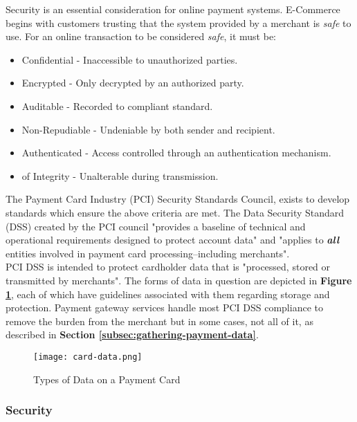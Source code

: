 Security is an essential consideration for online payment systems. E-Commerce begins with customers trusting that the system provided by a merchant is \textit{safe} to use. For an online transaction to be considered \textit{safe}, it must be:

\begin{itemize}
	\item Confidential - Inaccessible to unauthorized parties.
    \item Encrypted - Only decrypted by an authorized party.
    \item Auditable - Recorded to compliant standard.
    \item Non-Repudiable - Undeniable by both sender and recipient.
    \item Authenticated - Access controlled through an authentication mechanism.
    \item of Integrity - Unalterable during transmission.
\end{itemize}

The Payment Card Industry (PCI) Security Standards Council, exists to develop standards which ensure the above criteria are met. The Data Security Standard (DSS) created by the PCI council "provides a baseline of technical and operational requirements designed to protect account data" and "applies to \textit{\textbf{all}} entities involved in payment card processing--including merchants"\cite{PCI-DSS}.\\

PCI DSS is intended to protect cardholder data that is "processed, stored or transmitted by merchants"\cite{PCI-DSS}. The forms of data in question are depicted in \textbf{Figure \ref{fig:card-data}}, each of which have guidelines associated with them regarding storage and protection. Payment gateway services handle most PCI DSS compliance to remove the burden from the merchant but in some cases, not all of it, as described in \textbf{Section \ref{subsec:gathering-payment-data}}.

\begin{figure}[!hbt]
  	\centering
 	\texttt{[image: card-data.png]}
  	\caption{Types of Data on a Payment Card\cite{card-data}}
 	\label{fig:card-data}
\end{figure}

\subsubsection{Security}
\label{subsec:security}

